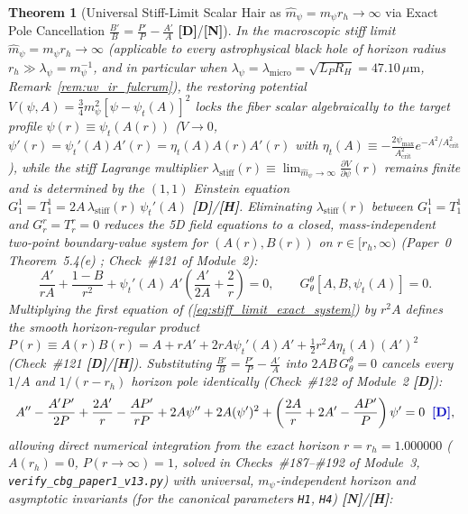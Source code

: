 \documentclass[11pt,a4paper]{article}
\newcommand{\catD}{\textbf{\textcolor{blue!75!black}{[D]}}}
\newcommand{\catH}{\textbf{\textcolor{orange!85!black}{[H]}}}
\newcommand{\catN}{\textbf{\textcolor{teal!75!black}{[N]}}}
\newtheorem{theorem}{Theorem}[section]
\theoremstyle{definition}
\theoremstyle{remark}
\begin{document}
\begin{theorem}[Universal Stiff-Limit Scalar Hair as $\hat{m}_{\psi} = m_{\psi}r_h \to \infty$ via Exact Pole Cancellation $\frac{B'}{B} = \frac{P'}{P} - \frac{A'}{A}$ \catD/\catN]
\label{thm:stiff_limit_universal_hair}
In the macroscopic stiff limit $\hat{m}_{\psi} = m_{\psi}r_h \to \infty$ (applicable to every astrophysical black hole of horizon radius $r_h \gg \lambda_{\psi} = m_{\psi}^{-1}$, and in particular when $\lambda_{\psi} = \lambda_{\text{micro}} = \sqrt{L_P R_H} = 47.10\,\mu\text{m}$, Remark~\ref{rem:uv_ir_fulcrum}), the restoring potential $V(\psi, A) = \frac{3}{4}m_{\psi}^2[\psi - \psi_t(A)]^2$ locks the fiber scalar algebraically to the target profile $\psi(r) \equiv \psi_t(A(r))$ ($V \to 0$, $\psi'(r) = \psi_t'(A)A'(r) = \eta_t(A)A(r)A'(r)$ with $\eta_t(A) \equiv -\frac{2\psi_{\max}}{A_{\text{crit}}^2}e^{-A^2/A_{\text{crit}}^2}$), while the stiff Lagrange multiplier $\lambda_{\text{stiff}}(r) \equiv \lim_{\hat{m}_{\psi}\to\infty}\frac{\partial V}{\partial\psi}(r)$ remains finite and is determined by the $(1,1)$ Einstein equation $G^1_1 = T^1_1 = 2 A\,\lambda_{\text{stiff}}(r)\,\psi_t'(A)$ \catD/\catH. Eliminating $\lambda_{\text{stiff}}(r)$ between $G^1_1 = T^1_1$ and $G^r_r = T^r_r = 0$ reduces the 5D field equations to a closed, mass-independent two-point boundary-value system for $(A(r), B(r))$ on $r \in [r_h, \infty)$ (Paper~0 Theorem~5.4(e) \cite{JV_Paper0}; Check~\#121 of Module~2):
\begin{equation}
  \frac{A'}{r A} + \frac{1 - B}{r^2} + \psi_t'(A)\,A'\left(\frac{A'}{2A} + \frac{2}{r}\right) = 0, \qquad
  G^{\theta}_{\theta}\!\left[A, B, \psi_t(A)\right] = 0.
  \label{eq:stiff_limit_exact_system}
\end{equation}
Multiplying the first equation of (\ref{eq:stiff_limit_exact_system}) by $r^2 A$ defines the smooth horizon-regular product $P(r) \equiv A(r)B(r) = A + r A' + 2 r A\psi_t'(A)A' + \frac{1}{2}r^2 A\eta_t(A)(A')^2$ (Check~\#121 \catD/\catH). Substituting $\frac{B'}{B} = \frac{P'}{P} - \frac{A'}{A}$ into $2 A B\,G^{\theta}_{\theta} = 0$ cancels every $1/A$ and $1/(r - r_h)$ horizon pole identically (Check~\#122 of Module~2 \catD):
\begin{equation}
  A'' - \frac{A' P'}{2 P} + \frac{2 A'}{r} - \frac{A P'}{r P} + 2 A\psi'' + 2 A(\psi')^2 + \left(\frac{2 A}{r} + 2 A' - \frac{A P'}{P}\right)\psi' = 0 \;\;\catD,
  \label{eq:stiff_limit_pole_free_ode}
\end{equation}
allowing direct numerical integration from the exact horizon $r = r_h = 1.000000$ ($A(r_h) = 0$, $P(r \to \infty) = 1$, solved in Checks~\#187--\#192 of Module~3, \allowbreak\texttt{verify\_cbg\_paper1\_v13.py}) with universal, $m_\psi$-independent horizon and asymptotic invariants (for the canonical parameters \texttt{H1}, \texttt{H4}) \catN/\catH:

\end{theorem}
\end{document}
